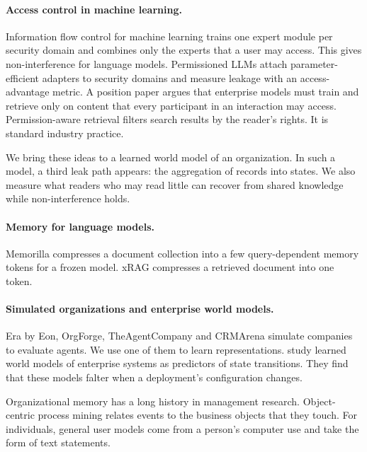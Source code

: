 \documentclass[11pt]{article}
\begin{document}
\paragraph{Access control in machine learning.} Information flow control for machine learning trains one expert module per security domain and combines only the experts that a user may access. This gives non-interference for language models\citep{tiwari2024ifc}. Permissioned LLMs attach parameter-efficient adapters to security domains and measure leakage with an access-advantage metric\citep{jayaraman2025permissioned}. A position paper argues that enterprise models must train and retrieve only on content that every participant in an interaction may access\citep{bhatt2025participant}. Permission-aware retrieval filters search results by the reader's rights. It is standard industry practice.

We bring these ideas to a learned world model of an organization. In such a model, a third leak path appears: the aggregation of records into states. We also measure what readers who may read little can recover from shared knowledge while non-interference holds.

\paragraph{Memory for language models.} Memorilla compresses a document collection into a few query-dependent memory tokens for a frozen model\citep{fallahpour2026memorilla}. xRAG compresses a retrieved document into one token\citep{cheng2024xrag}.

\paragraph{Simulated organizations and enterprise world models.} Era by Eon\citep{gruenbaum2026era}, OrgForge\citep{flynt2026orgforge}, TheAgentCompany\citep{xu2024theagentcompany} and CRMArena\citep{huang2024crmarena} simulate companies to evaluate agents. We use one of them to learn representations. \citet{nair2026enterprise} study learned world models of enterprise systems as predictors of state transitions. They find that these models falter when a deployment's configuration changes.

Organizational memory has a long history in management research\citep{walsh1991organizational}. Object-centric process mining relates events to the business objects that they touch\citep{vanderaalst2019object}. For individuals, general user models come from a person's computer use and take the form of text statements\citep{shaikh2025gum}.
\end{document}
